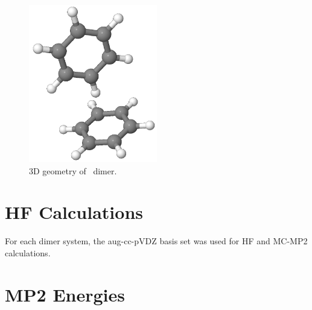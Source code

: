 \begin{figure}
\centering
\includegraphics[width = 0.5\textwidth]{figures/benzene-T-shaped.png}
\caption{3D geometry of \benzT\ dimer.}
\end{figure}

\section{HF Calculations}

For each dimer system, the aug-cc-pVDZ basis set was used for HF and MC-MP2
calculations.

\section{MP2 Energies}

